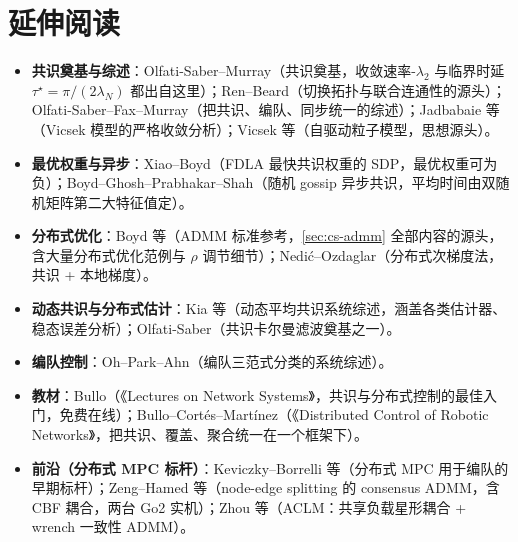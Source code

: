 \section*{延伸阅读}
\begin{itemize}
  \item \textbf{共识奠基与综述}：Olfati-Saber--Murray\cite{olfatisaber2004consensus}（共识奠基，收敛速率-$\lambda_2$ 与临界时延 $\tau^\star=\pi/(2\lambda_N)$ 都出自这里）；Ren--Beard\cite{renbeard2005consensus}（切换拓扑与联合连通性的源头）；Olfati-Saber--Fax--Murray\cite{olfatisaber2007consensus}（把共识、编队、同步统一的综述）；Jadbabaie 等\cite{jadbabaie2003coordination}（Vicsek 模型的严格收敛分析）；Vicsek 等\cite{vicsek1995novel}（自驱动粒子模型，思想源头）。
  \item \textbf{最优权重与异步}：Xiao--Boyd\cite{xiaoboyd2004fast}（FDLA 最快共识权重的 SDP，最优权重可为负）；Boyd--Ghosh--Prabhakar--Shah\cite{boyd2006gossip}（随机 gossip 异步共识，平均时间由双随机矩阵第二大特征值定）。
  \item \textbf{分布式优化}：Boyd 等\cite{boyd2011admm}（ADMM 标准参考，\cref{sec:cs-admm} 全部内容的源头，含大量分布式优化范例与 $\rho$ 调节细节）；Nedi\'c--Ozdaglar\cite{nedic2009distributed}（分布式次梯度法，共识 + 本地梯度）。
  \item \textbf{动态共识与分布式估计}：Kia 等\cite{kia2019dynamic}（动态平均共识系统综述，涵盖各类估计器、稳态误差分析）；Olfati-Saber\cite{olfatisaber2007kalman}（共识卡尔曼滤波奠基之一）。
  \item \textbf{编队控制}：Oh--Park--Ahn\cite{oh2015formation}（编队三范式分类的系统综述）。
  \item \textbf{教材}：Bullo\cite{bullo2019network}（《Lectures on Network Systems》，共识与分布式控制的最佳入门，免费在线）；Bullo--Cort\'es--Mart\'inez\cite{bullo2009distributed}（《Distributed Control of Robotic Networks》，把共识、覆盖、聚合统一在一个框架下）。
  \item \textbf{前沿（分布式 MPC 标杆）}：Keviczky--Borrelli 等\cite{keviczky2008decentralized}（分布式 MPC 用于编队的早期标杆）；Zeng--Hamed 等\cite{zeng2026admmcbf}（node-edge splitting 的 consensus ADMM，含 CBF 耦合，两台 Go2 实机）；Zhou 等\cite{zhou2026aclm}（ACLM：共享负载星形耦合 + wrench 一致性 ADMM）。
\end{itemize}

